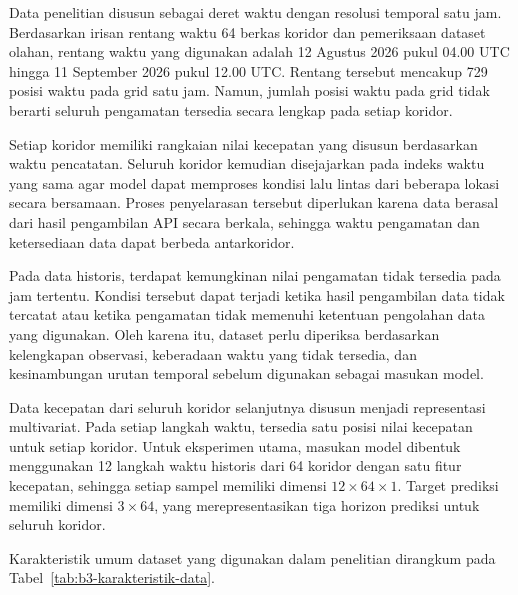 Data penelitian disusun sebagai deret waktu dengan resolusi temporal satu jam. Berdasarkan irisan rentang waktu 64 berkas koridor dan pemeriksaan dataset olahan, rentang waktu yang digunakan adalah 12 Agustus 2026 pukul 04.00 UTC hingga 11 September 2026 pukul 12.00 UTC. Rentang tersebut mencakup 729 posisi waktu pada grid satu jam. Namun, jumlah posisi waktu pada grid tidak berarti seluruh pengamatan tersedia secara lengkap pada setiap koridor.

Setiap koridor memiliki rangkaian nilai kecepatan yang disusun berdasarkan waktu pencatatan. Seluruh koridor kemudian disejajarkan pada indeks waktu yang sama agar model dapat memproses kondisi lalu lintas dari beberapa lokasi secara bersamaan. Proses penyelarasan tersebut diperlukan karena data berasal dari hasil pengambilan API secara berkala, sehingga waktu pengamatan dan ketersediaan data dapat berbeda antarkoridor.

Pada data historis, terdapat kemungkinan nilai pengamatan tidak tersedia pada jam tertentu. Kondisi tersebut dapat terjadi ketika hasil pengambilan data tidak tercatat atau ketika pengamatan tidak memenuhi ketentuan pengolahan data yang digunakan. Oleh karena itu, dataset perlu diperiksa berdasarkan kelengkapan observasi, keberadaan waktu yang tidak tersedia, dan kesinambungan urutan temporal sebelum digunakan sebagai masukan model.

Data kecepatan dari seluruh koridor selanjutnya disusun menjadi representasi multivariat. Pada setiap langkah waktu, tersedia satu posisi nilai kecepatan untuk setiap koridor. Untuk eksperimen utama, masukan model dibentuk menggunakan 12 langkah waktu historis dari 64 koridor dengan satu fitur kecepatan, sehingga setiap sampel memiliki dimensi $12\times64\times1$. Target prediksi memiliki dimensi $3\times64$, yang merepresentasikan tiga horizon prediksi untuk seluruh koridor.

Karakteristik umum dataset yang digunakan dalam penelitian dirangkum pada Tabel~\ref{tab:b3-karakteristik-data}.

